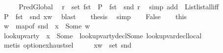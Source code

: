 \begin{isabellebody}
\ \ \isamarkupfalse%
\ \isamarkupfalse%
\ PredGlobal\ \isamarkupfalse%
\ {\isachardoublequoteopen}{\isasymforall}r\ {\isasymin}\ set\ {\isacharparenleft}{\kern0pt}fst\ {\isasymLambda}{\isacharparenright}{\kern0pt}{\isachardot}{\kern0pt}\ {\isacharparenleft}{\kern0pt}P\ {\isasymcirc}\ fst\ {\isasymcirc}\ snd{\isacharparenright}{\kern0pt}\ r{\isachardoublequoteclose}\ \isamarkupfalse%
\ {\isacharparenleft}{\kern0pt}simp\ add{\isacharcolon}{\kern0pt}\ \ List{\isachardot}{\kern0pt}list{\isacharunderscore}{\kern0pt}all{\isacharunderscore}{\kern0pt}iff{\isacharparenright}{\kern0pt}\isanewline
\ \ \isamarkupfalse%
\ \isamarkupfalse%
\ {\isachardoublequoteopen}{\isacharparenleft}{\kern0pt}P\ {\isasymcirc}\ fst\ {\isasymcirc}\ snd{\isacharparenright}{\kern0pt}\ {\isacharparenleft}{\kern0pt}x{\isacharcomma}{\kern0pt}{\isacharparenleft}{\kern0pt}{\isasymtau}{\isacharcomma}{\kern0pt}w{\isacharparenright}{\kern0pt}{\isacharparenright}{\kern0pt}{\isachardoublequoteclose}\ \isamarkupfalse%
\ blast\isanewline
\ \ \isamarkupfalse%
\ {\isacharquery}{\kern0pt}thesis\ \isamarkupfalse%
\ simp\isanewline
{}\isamarkupfalse%
\isanewline
\ \ \isamarkupfalse%
\ False\isanewline
\ \ \isamarkupfalse%
\ this\ \isamarkupfalse%
\ w\ \ {\isachardoublequoteopen}map{\isacharunderscore}{\kern0pt}of\ {\isacharparenleft}{\kern0pt}snd\ {\isasymLambda}{\isacharparenright}{\kern0pt}\ x\ {\isacharequal}{\kern0pt}\ Some\ {\isacharparenleft}{\kern0pt}{\isasymtau}{\isacharcomma}{\kern0pt}w{\isacharparenright}{\kern0pt}{\isachardoublequoteclose}\isanewline
\ \ \ \ \isamarkupfalse%
\ {\isacartoucheopen}lookup{\isacharunderscore}{\kern0pt}var{\isacharunderscore}{\kern0pt}ty\ {\isasymLambda}\ x\ {\isacharequal}{\kern0pt}\ Some\ {\isasymtau}{\isacartoucheclose}\ lookup{\isacharunderscore}{\kern0pt}var{\isacharunderscore}{\kern0pt}ty{\isacharunderscore}{\kern0pt}decl{\isacharunderscore}{\kern0pt}Some\ lookup{\isacharunderscore}{\kern0pt}var{\isacharunderscore}{\kern0pt}decl{\isacharunderscore}{\kern0pt}local\isanewline
\ \ \ \ \isamarkupfalse%
\ {\isacharparenleft}{\kern0pt}metis\ option{\isachardot}{\kern0pt}exhaust{\isacharunderscore}{\kern0pt}sel{\isacharparenright}{\kern0pt}\isanewline
\ \ \isamarkupfalse%
\ \isamarkupfalse%
\ {\isachardoublequoteopen}{\isacharparenleft}{\kern0pt}x{\isacharcomma}{\kern0pt}{\isacharparenleft}{\kern0pt}{\isasymtau}{\isacharcomma}{\kern0pt}w{\isacharparenright}{\kern0pt}{\isacharparenright}{\kern0pt}\ {\isasymin}\ set\ {\isacharparenleft}{\kern0pt}snd\ {\isasymLambda}{\isacharparenright}{\kern0pt}{\isachardoublequoteclose}\ \isamarkupfalse%

\end{isabellebody}
